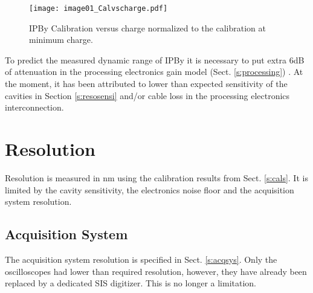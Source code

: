 \begin{figure}[!htb]
\centering%
 \texttt{[image: image01\_Calvscharge.pdf]}\caption{IPBy Calibration versus charge normalized to the calibration at minimum charge.}\label{f:chargescan}
\end{figure}
To predict the measured dynamic range of IPBy it is necessary to put extra 6dB of attenuation in the processing electronics gain model (Sect. \ref{s:processing}) . At the moment, it has been attributed to lower than expected sensitivity of the cavities in Section \ref{s:resosensi} and/or cable loss in the processing electronics interconnection.\par

\section{Resolution}\label{s:resolution}
Resolution is measured in nm using the calibration results from Sect. \ref{s:cals}. It is limited by the cavity sensitivity, the electronics noise floor and the acquisition system resolution.\par
\subsection{Acquisition System}
The acquisition system resolution is specified in Sect. \ref{s:acqsys}. Only the oscilloscopes had lower than required resolution, however, they have already been replaced by a dedicated SIS digitizer. This is no longer a limitation.\par
